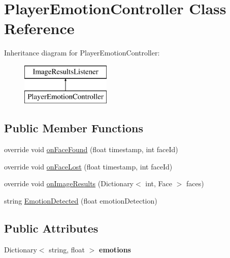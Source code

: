 \hypertarget{class_player_emotion_controller}{}\section{Player\+Emotion\+Controller Class Reference}
\label{class_player_emotion_controller}
Inheritance diagram for Player\+Emotion\+Controller\+:\begin{figure}[H]
\begin{center}
\leavevmode
\includegraphics[height=2.000000cm]{class_player_emotion_controller}
\end{center}
\end{figure}
\subsection*{Public Member Functions}
\begin{DoxyCompactItemize}
\item 
override void \mbox{\hyperlink{class_player_emotion_controller_ae49d14f99ec4326fb8633e4069f76aa2}{on\+Face\+Found}} (float timestamp, int face\+Id)
\item 
override void \mbox{\hyperlink{class_player_emotion_controller_a27c247c8051c1026716b7f21a896ae61}{on\+Face\+Lost}} (float timestamp, int face\+Id)
\item 
override void \mbox{\hyperlink{class_player_emotion_controller_a00e185773c0a3ce8a659bb78f4e9b952}{on\+Image\+Results}} (Dictionary$<$ int, Face $>$ faces)
\item 
string \mbox{\hyperlink{class_player_emotion_controller_ad0671b88a534bb741bb25b0c9b6264c4}{Emotion\+Detected}} (float emotion\+Detection)
\end{DoxyCompactItemize}
\subsection*{Public Attributes}
\begin{DoxyCompactItemize}
\item 
\mbox{\label{class_player_emotion_controller_afd0e863b7b8b4eb4884f30b5b2675b47}} 
Dictionary$<$ string, float $>$ {\bfseries emotions}
\end{DoxyCompactItemize}
